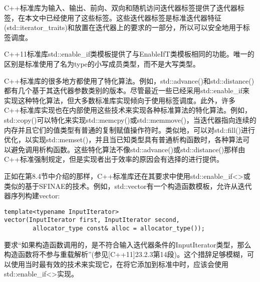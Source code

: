 C++标准库为输入、输出、前向、双向和随机访问迭代器标签提供了迭代器标签，在本文中已经使用了这些标签。这些迭代器标签是标准迭代器特征(std::iterator\_traits)和放置在迭代器上的要求的一部分，所以可以安全地用于标签调度。

C++11标准库std::enable\_if类模板提供了与EnableIfT类模板相同的功能。唯一的区别是标准使用了名为type的小写成员类型，而不是大写类型。

C++标准库的很多地方都使用了特化算法。例如，std::advance()和std::distance()都有几个基于其迭代器参数类别的版本。尽管最近一些已经采用std::enable\_if来实现这种特化算法，但大多数标准库实现倾向于使用标签调度。此外，许多C++标准库实现也在内部使用这些技术来实现各种标准算法的特化算法。例如，std::copy()可以特化来实现std::memcpy()或std::memmove()，当迭代器指向连续的内存并且它们的值类型有普通的复制赋值操作符时。类似地，可以对std::fill()进行优化，以实现std::memset()，并且当已知类型具有普通析构函数时，各种算法可以避免调用析构函数。这些特化算法不像std::advance()或std::distance()那样由C++标准强制规定，但是实现者出于效率的原因会有选择的进行提供。

正如在第8.4节中介绍的那样，C++标准库还在其要求中使用std::enable\_if<>或类似的基于SFINAE的技术。例如，std::vector有一个构造函数模板，允许从迭代器序列构建vector:

\begin{lstlisting}[style=styleCXX]
template<typename InputIterator>
vector(InputIterator first, InputIterator second,
		allocator_type const& alloc = allocator_type());
\end{lstlisting}

要求“如果构造函数调用的，是不符合输入迭代器条件的InputIterator类型，那么构造函数将不参与重载解析”(参见[C++11]23.2.3第14段)。这个措辞足够模糊，可以使用当时最有效的技术来实现它，在将它添加到标准中时，应该会使用std::enable\_if<>实现。

























